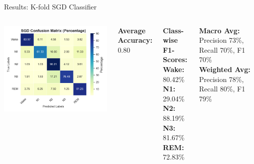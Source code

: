 \begin{frame}{Results: K-fold SGD Classifier}
	\begin{columns}
		\centering
		\includegraphics[width=\linewidth]{images/paper_1/SGD_percentage_based}
		
		\scriptsize
		\textbf{Average Accuracy:} 0.80
		
		\vspace{0.3em}
		\textbf{Class-wise F1-Scores:} \\
		\textbf{Wake:} 80.42\% \\
		\textbf{N1:} 29.04\% \\
		\textbf{N2:} 88.19\% \\
		\textbf{N3:} 81.67\% \\
		\textbf{REM:} 72.83\%
		
		\vspace{0.3em}
		\textbf{Macro Avg:} Precision 73\%, Recall 70\%, F1 70\% \\
		\textbf{Weighted Avg:} Precision 78\%, Recall 80\%, F1 79\%
	\end{columns}
\end{frame}
